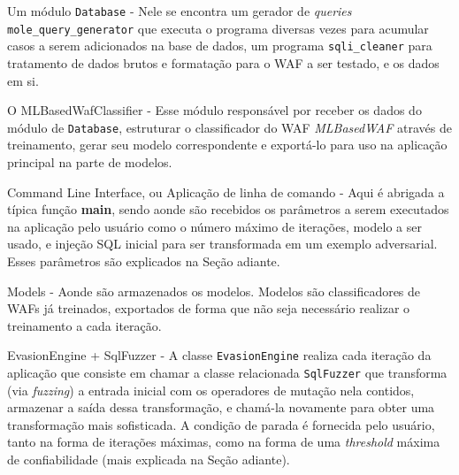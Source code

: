 \begin{alineas}
\item Um módulo \verb+Database+ - Nele se encontra um gerador de \textit{queries} \verb+mole_query_generator+ que executa o programa diversas vezes para acumular casos a serem adicionados na base de dados, um programa \verb+sqli_cleaner+ para tratamento de dados brutos e formatação para o WAF a ser testado, e os dados em si.

\item O MLBasedWafClassifier - Esse módulo responsável por receber os dados do módulo de \verb+Database+, estruturar o classificador do WAF \textit{MLBasedWAF} através de treinamento, gerar seu modelo correspondente e exportá-lo para uso na aplicação principal na parte de modelos.

\item Command Line Interface, ou Aplicação de linha de comando - Aqui é abrigada a típica função \textbf{main}, sendo aonde são recebidos os parâmetros a serem executados na aplicação pelo usuário como o número máximo de iterações, modelo a ser usado, e injeção SQL inicial para ser transformada em um exemplo adversarial. Esses parâmetros são explicados na Seção adiante.

\item Models - Aonde são armazenados os modelos. Modelos são classificadores de WAFs já treinados, exportados de forma que não seja necessário realizar o treinamento a cada iteração. 

\item EvasionEngine + SqlFuzzer - A classe \verb+EvasionEngine+ realiza cada iteração da aplicação que consiste em chamar a classe relacionada \verb+SqlFuzzer+ que transforma (via \textit{fuzzing}) a entrada inicial com os operadores de mutação nela contidos, armazenar a saída dessa transformação, e chamá-la novamente para obter uma transformação mais sofisticada. A condição de parada é fornecida pelo usuário, tanto na forma de iterações máximas, como na forma de uma \textit{threshold} máxima de confiabilidade (mais explicada na Seção adiante).

\end{alineas}

